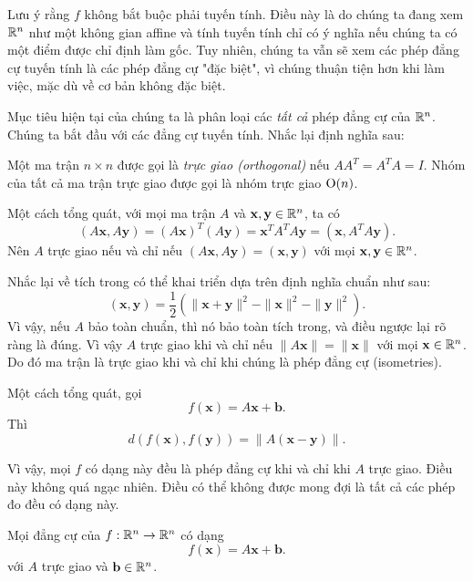Lưu ý rằng $f$ không bắt buộc phải tuyến tính. Điều này là do chúng ta đang xem $\mathbb{R}^n$ như một không gian affine và tính tuyến tính chỉ có ý nghĩa nếu chúng ta có một điểm được chỉ định làm gốc. Tuy nhiên, chúng ta vẫn sẽ xem các phép đẳng cự tuyến tính là các phép đẳng cự "đặc biệt", vì chúng thuận tiện hơn khi làm việc, mặc dù về cơ bản không đặc biệt.

Mục tiêu hiện tại của chúng ta là phân loại các \emph{tất cả} phép đẳng cự của $\mathbb{R}^n$. Chúng ta bắt đầu với các đẳng cự tuyến tính. Nhắc lại định nghĩa sau:
\begin{defi}
  Một ma trận $n \times n$ được gọi là \emph{trực giao (orthogonal)} nếu $AA^T = A^T A = I$. Nhóm của tất cả ma trận trực giao được gọi là nhóm trực giao $\mathrm{O}(n)$.
\end{defi}

Một cách tổng quát, với mọi ma trận $A$ và $\mathbf{x}, \mathbf{y} \in \mathbb{R}^n$, ta có
\[
  (A\mathbf{x}, A \mathbf{y}) = (A\mathbf{x})^T (A \mathbf{y}) = \mathbf{x}^T A^T A \mathbf{y} = (\mathbf{x}, A^T A \mathbf{y}).
\]
Nên $A$ trực giao nếu và chỉ nếu $(A\mathbf{x}, A\mathbf{y}) = (\mathbf{x}, \mathbf{y})$ với mọi $\mathbf{x}, \mathbf{y} \in \mathbb{R}^n$.

Nhắc lại về tích trong có thể khai triển dựa trên định nghĩa chuẩn như sau:
\[
  (\mathbf{x}, \mathbf{y}) = \frac{1}{2}(\|\mathbf{x} + \mathbf{y}\|^2 - \|\mathbf{x}\|^2 -\|\mathbf{y}\|^2).
\]
Vì vậy, nếu $A$ bảo toàn chuẩn, thì nó bảo toàn tích trong, và điều ngược lại rõ ràng là đúng. Vì vậy $A$ trực giao khi và chỉ nếu $\|A\mathbf{x}\| = \|\mathbf{x}\|$ với mọi $\mathbf{x} \in \mathbb{R}^n$. Do đó ma trận là trực giao khi và chỉ khi chúng là phép đẳng cự (isometries).

Một cách tổng quát, gọi
\[
  f(\mathbf{x}) = A\mathbf{x} + \mathbf{b}.
\]
Thì
\[
  d(f(\mathbf{x}), f(\mathbf{y})) = \|A(\mathbf{x} - \mathbf{y})\|.
\]

Vì vậy, mọi $f$ có dạng này đều là phép đẳng cự khi và chỉ khi $A$ trực giao. Điều này không quá ngạc nhiên. Điều có thể không được mong đợi là tất cả các phép đo đều có dạng này.

\begin{theorem}
  Mọi đẳng cự của $f: \mathbb{R}^n \to \mathbb{R}^n$ có dạng
  \[
    f(\mathbf{x}) = A\mathbf{x} + \mathbf{b}.
  \]
  với $A$ trực giao và $\mathbf{b} \in \mathbb{R}^n$.
\end{theorem}

